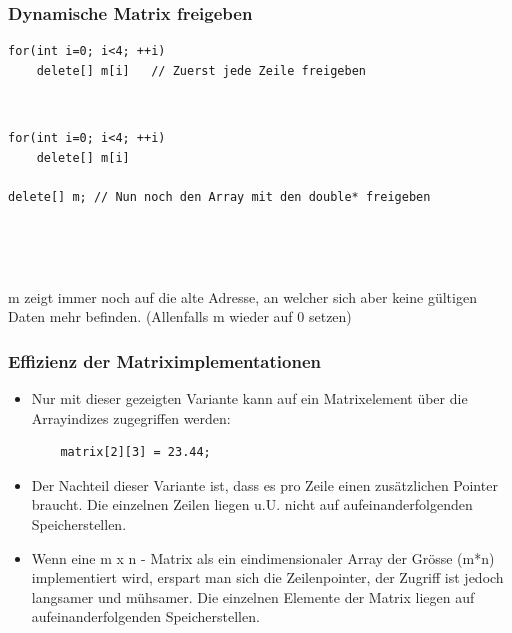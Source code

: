 \subsubsection{Dynamische Matrix freigeben}
\label{sec:Dynamische Matrix freigeben}
\noindent
\begin{minipage}{\linewidth}
\begin{lstlisting}
for(int i=0; i<4; ++i)
	delete[] m[i]	// Zuerst jede Zeile freigeben		
\end{lstlisting}
\end{minipage}
\begin{figure}[hh]
	\centering
	
	\\
	
\end{figure}
\vspace{1cm}
\noindent
\begin{minipage}{\linewidth}
\begin{lstlisting}
for(int i=0; i<4; ++i)
	delete[] m[i]

delete[] m;	// Nun noch den Array mit den double* freigeben
\end{lstlisting}
\end{minipage}
\begin{figure}[hh]
	\centering
	
	\\
	
\end{figure}
\\
\vspace{1cm}
\begin{achtung}
m zeigt immer noch auf die alte Adresse, an welcher sich aber keine gültigen Daten mehr befinden. (Allenfalls m wieder auf 0 setzen)
\end{achtung}

\subsubsection{Effizienz der Matriximplementationen}
\label{sec:Effizienz der Matriximplementationen}
\begin{itemize}
	\item Nur mit dieser gezeigten Variante kann auf ein Matrixelement über die Arrayindizes zugegriffen werden:
	\begin{minipage}{\linewidth}
	\begin{lstlisting}
	matrix[2][3] = 23.44;
	\end{lstlisting}
	\end{minipage}
	\item Der Nachteil dieser Variante ist, dass es pro Zeile einen zusätzlichen Pointer braucht. Die einzelnen Zeilen liegen u.U. nicht auf aufeinanderfolgenden Speicherstellen.
	\item Wenn eine m x n - Matrix als ein eindimensionaler Array der Grösse (m*n) implementiert wird, erspart man sich die Zeilenpointer, der Zugriff ist jedoch langsamer und mühsamer. Die einzelnen Elemente der Matrix liegen auf aufeinanderfolgenden Speicherstellen.
\end{itemize}

